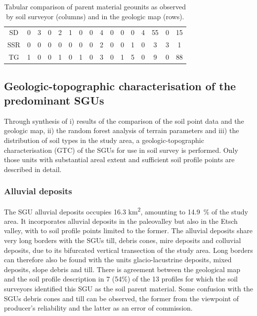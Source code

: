 \documentclass[preprint,12pt,authoryear]{elsarticle}
\begin{document}
\begin{table}[ht]
\begin{tabular}{c|ccccccccccccccc}
  SD &   0 &   3 &   0 &   2 &   1 &   0 &   0 &   4 &   0 &   0 &   0 &   4 &  55 &   0 &  15 \\ 
  SSR &   0 &   0 &   0 &   0 &   0 &   0 &   0 &   2 &   0 &   0 &   1 &   0 &   3 &   3 &   1 \\ 
  TG &   1 &   0 &   0 &   1 &   0 &   1 &   0 &   3 &   0 &   1 &   5 &   0 &   9 &   0 &  88 \\ 
   \hline
\end{tabular}
\caption{Tabular comparison of parent material geounits as observed by soil surveyor (columns) and in the geologic map (rows).} 
\label{kartiergegenkarte}
\end{table}



\subsection{Geologic-topographic characterisation of the predominant SGUs}
Through synthesis of i) results of the comparison of the soil point data and the geologic map, ii) the random forest analysis of terrain parameters and iii) the distribution of soil types in the study area, a geologic-topographic characterisation (GTC) of the  SGUs for use in soil survey is performed. Only those units with substantial areal extent and sufficient soil profile points are described in detail.

\subsubsection{Alluvial deposits}
The SGU alluvial deposits occupies 16.3 km\textsuperscript{2}, amounting to 14.9~\% of the study area. It incorporates alluvial deposits in the paleovalley but also in the Etsch valley, with to soil profile points limited to the former. The alluvial deposits share very long borders with the SGUs till, debris cones, mire deposits and colluvial deposits, due to its bifurcated vertical transection of the study area. Long borders can therefore also be found with the units glacio-lacustrine deposits, mixed deposits, slope debris and till. There is agreement between the geological map and the soil profile description in 7 (54\%) of the 13 profiles for which the soil surveyors identified this SGU as the soil parent material. Some confusion with the SGUs debris cones and till can be observed, the former from the viewpoint of producer's reliability and the latter as an error of commission.  
\end{document}
